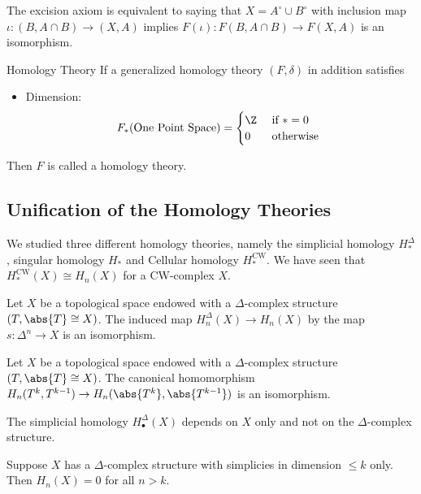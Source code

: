\documentclass[a4paper]{article}
\begin{document}
\begin{lmm}{}{} The excision axiom is equivalent to saying that $X=A^\circ\cup B^\circ$ with inclusion map $\iota:(B,A\cap B)\to (X,A)$ implies $F(\iota):F(B,A\cap B)\to F(X,A)$ is an isomorphism. 
\end{lmm}

\begin{defn}{Homology Theory}{} If a generalized homology theory $(F,\delta)$ in addition satisfies 
\begin{itemize}
\item Dimension: $$F_\ast(\text{One Point Space})=\begin{cases}
\Z & \text{ if } \ast=0\\
0 & \text{ otherwise }
\end{cases}$$
\end{itemize}
Then $F$ is called a homology theory. 
\end{defn}

\subsection{Unification of the Homology Theories}
We studied three different homology theories, namely the simplicial homology $H_\ast^{\Delta}$, singular homology $H_\ast$ and Cellular homology $H_\ast^{\text{CW}}$. We have seen that $H_\ast^{\text{CW}}(X)\cong H_n(X)$ for a CW-complex $X$. 

\begin{thm}{}{} Let $X$ be a topological space endowed with a $\Delta$-complex structure $(T,\abs{T}\cong X)$. The induced map $H_n^\Delta(X)\to H_n(X)$ by the map $s:\Delta^n\to X$ is an isomorphism. 
\end{thm}

\begin{lmm}{}{} Let $X$ be a topological space endowed with a $\Delta$-complex structure $(T,\abs{T}\cong X)$. The canonical homomorphism $H_n(T^k,T^{k-1})\to H_n(\abs{T^k},\abs{T^{k-1}})$ is an isomorphism. 
\end{lmm}

\begin{crl}{}{} The simplicial homology $H_\bullet^\Delta(X)$ depends on $X$ only and not on the $\Delta$-complex structure. 
\end{crl}

\begin{crl}{}{} Suppose $X$ has a $\Delta$-complex structure with simplicies in dimension $\leq k$ only. Then $H_n(X)=0$ for all $n>k$. 
\end{crl}
\end{document}
